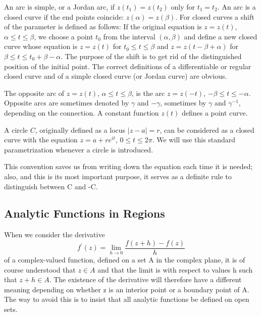 An arc is simple, or a Jordan arc, if $z(t_{1}) = z(t_{2})$ only for $t_{1} = t_{2}$. An arc is a closed curve if the end points coincide: $z(\alpha) = z(\beta)$. For closed curves a shift of the parameter is defined as follows: If the original equation is $z = z(t)$, $\alpha \leq t \leq \beta$, we choose a point $t_{0}$ from the interval $(\alpha, \beta)$ and define a new closed curve whose equation is $z = z(t)$ for $t_{0} \leq t \leq \beta$ and $z = z(t - \beta + \alpha)$ for $\beta \leq t \leq t_{0} + \beta - \alpha$. The purpose of the shift is to get rid of the distinguished position of the initial point. The correct definitions of a differentiable or regular closed curve and of a simple closed curve (or Jordan curve) are obvious.

The opposite arc of $z = z(t)$, $\alpha \leq t \leq \beta$, is the arc $z = z(-t)$, $-\beta \leq t \leq -\alpha$. Opposite arcs are sometimes denoted by $\gamma$ and $-\gamma$, sometimes by $\gamma$ and $\gamma^{-1}$, depending on the connection. A constant function $z(t)$ defines a point curve.

A circle $C$, originally defined as a locus $|z - a| = r$, can be considered as a closed curve with the equation $z = a + re^{it}$, $0 \leq t \leq 2\pi$. We will use this standard parametrization whenever a circle is introduced.

This convention saves us from writing down the equation each time it is
needed; also, and this is its most important purpose, it serves as a definite rule to distinguish between C and -C.

\setcounter{section}{2}\setcounter{subsection}{1}\subsection{Analytic Functions in Regions}\label{sec:3.2.2}
When we consider the derivative
\begin{equation*}
f ^ {\prime} (z) = \lim _ {h \rightarrow 0} \frac {f (z + h) - f (z)}{h}
\end{equation*}
of a complex-valued function, defined on a set A in the complex plane, it is of course understood that $z \in A$ and that the limit is with respect to values h such that $z + h \in A$. The existence of the derivative will therefore have a different meaning depending on whether z is an interior point or a boundary point of A. The way to avoid this is to insist that all analytic functions be defined on open sets.

